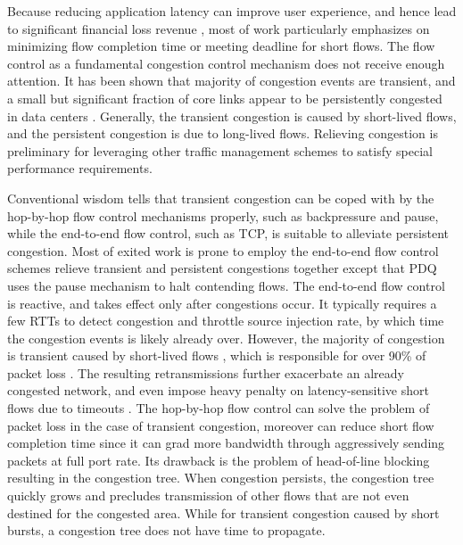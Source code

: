 \documentclass[]{sig-alternate-10pt}
\begin{document}
Because reducing application latency can improve user experience, and hence lead to significant financial loss revenue \cite{latency}, most of work particularly emphasizes on minimizing flow completion time or meeting deadline for short flows. The flow control as a fundamental congestion control mechanism does not receive enough attention. It has been shown that majority of congestion events are transient, and a small but significant fraction of core links appear to be persistently congested in data centers \cite{kandula2009nature, benson2010network}. Generally, the transient congestion is caused by short-lived flows, and the persistent congestion is due to long-lived flows. Relieving congestion is preliminary for leveraging other traffic management schemes to satisfy special performance requirements.

Conventional wisdom tells that transient congestion can be coped with by the hop-by-hop flow control mechanisms properly, such as backpressure and pause, while the end-to-end flow control, such as TCP, is suitable to alleviate persistent congestion. Most of exited work is prone to employ the end-to-end flow control schemes relieve transient and persistent congestions together except that PDQ \cite{hong2012finishing} uses the pause mechanism to halt contending flows. The end-to-end flow control is reactive, and takes effect only after congestions occur. It typically requires a few RTTs to detect congestion and throttle source injection rate, by which time the congestion events is likely already over. However, the majority of congestion is transient caused by short-lived flows \cite{kandula2009nature, benson2010network}, which is responsible for over 90\% of packet loss \cite{kandula2009nature}. The resulting retransmissions further exacerbate an already congested network, and even impose heavy penalty on latency-sensitive short flows due to timeouts \cite{alizadeh2011data}. The hop-by-hop flow control can solve the problem of packet loss in the case of transient congestion, moreover can reduce short flow completion time since it can grad more bandwidth through aggressively sending packets at full port rate. Its drawback is the problem of head-of-line blocking resulting in the congestion tree. When congestion persists, the congestion tree quickly grows and precludes transmission of other flows that are not even destined for the congested area. While for transient congestion caused by short bursts, a congestion tree does not have time to propagate.
\end{document}
